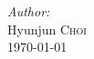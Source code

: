 \begin{titlepage}
  \Large \emph{Author:}\\
  Hyunjun \textsc{Choi}\\[3cm] %
  
  
  {\large \today}\\[2cm] %
  
  \vfill %
  
  \end{titlepage}